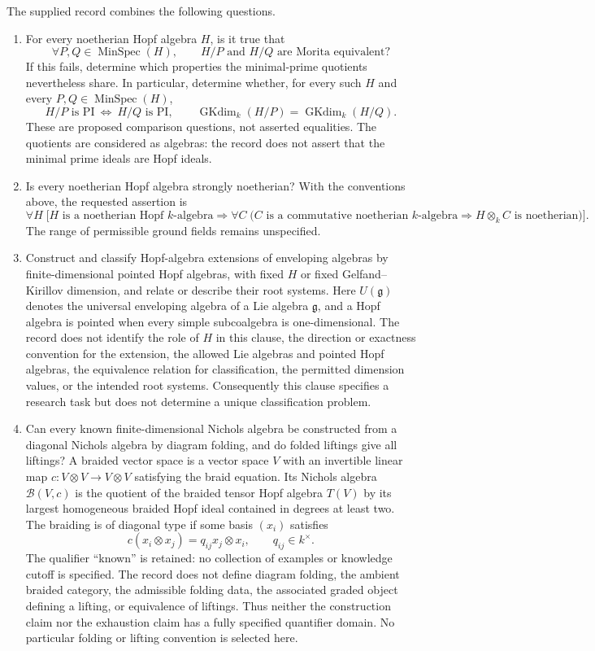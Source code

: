 \documentclass[11pt]{article}
\begin{document}
The supplied record combines the following questions.
\begin{enumerate}
\item For every noetherian Hopf algebra \(H\), is it true that
\[
\forall P,Q\in\operatorname{MinSpec}(H),\qquad
H/P\text{ and }H/Q\text{ are Morita equivalent}?
\]
If this fails, determine which properties the minimal-prime quotients nevertheless share. In particular, determine whether, for every such \(H\) and every \(P,Q\in\operatorname{MinSpec}(H)\),
\[
H/P\text{ is PI}\ \Longleftrightarrow\ H/Q\text{ is PI},
\qquad
\operatorname{GKdim}_k(H/P)=\operatorname{GKdim}_k(H/Q).
\]
These are proposed comparison questions, not asserted equalities. The quotients are considered as algebras: the record does not assert that the minimal prime ideals are Hopf ideals.

\item Is every noetherian Hopf algebra strongly noetherian? With the conventions above, the requested assertion is
\[
\forall H\;\bigl[H\text{ is a noetherian Hopf }k\text{-algebra}
\Longrightarrow
\forall C\;\bigl(C\text{ is a commutative noetherian }k\text{-algebra}
\Longrightarrow H\otimes_k C\text{ is noetherian}\bigr)\bigr].
\]
The range of permissible ground fields remains unspecified.

\item Construct and classify Hopf-algebra extensions of enveloping algebras by finite-dimensional pointed Hopf algebras, with fixed \(H\) or fixed Gelfand--Kirillov dimension, and relate or describe their root systems. Here \(U(\mathfrak g)\) denotes the universal enveloping algebra of a Lie algebra \(\mathfrak g\), and a Hopf algebra is pointed when every simple subcoalgebra is one-dimensional. The record does not identify the role of \(H\) in this clause, the direction or exactness convention for the extension, the allowed Lie algebras and pointed Hopf algebras, the equivalence relation for classification, the permitted dimension values, or the intended root systems. Consequently this clause specifies a research task but does not determine a unique classification problem.

\item Can every known finite-dimensional Nichols algebra be constructed from a diagonal Nichols algebra by diagram folding, and do folded liftings give all liftings? A braided vector space is a vector space \(V\) with an invertible linear map \(c:V\otimes V\to V\otimes V\) satisfying the braid equation. Its Nichols algebra \(\mathcal B(V,c)\) is the quotient of the braided tensor Hopf algebra \(T(V)\) by its largest homogeneous braided Hopf ideal contained in degrees at least two. The braiding is of diagonal type if some basis \((x_i)\) satisfies
\[
c(x_i\otimes x_j)=q_{ij}x_j\otimes x_i,
\qquad q_{ij}\in k^\times.
\]
The qualifier ``known'' is retained: no collection of examples or knowledge cutoff is specified. The record does not define diagram folding, the ambient braided category, the admissible folding data, the associated graded object defining a lifting, or equivalence of liftings. Thus neither the construction claim nor the exhaustion claim has a fully specified quantifier domain. No particular folding or lifting convention is selected here.
\end{enumerate}
\end{document}
